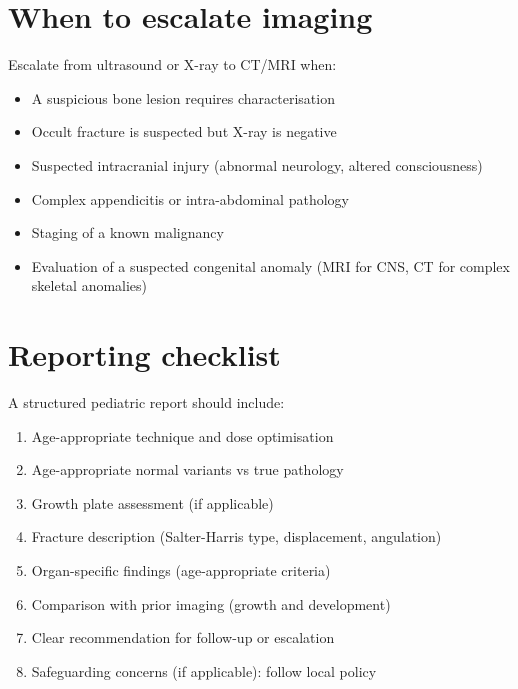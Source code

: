 \section{When to escalate imaging}
Escalate from ultrasound or X-ray to CT/MRI when:
\begin{itemize}
    \item A suspicious bone lesion requires characterisation
    \item Occult fracture is suspected but X-ray is negative
    \item Suspected intracranial injury (abnormal neurology, altered consciousness)
    \item Complex appendicitis or intra-abdominal pathology
    \item Staging of a known malignancy
    \item Evaluation of a suspected congenital anomaly (MRI for CNS, CT for complex skeletal anomalies)
\end{itemize}

\section{Reporting checklist}
A structured pediatric report should include:
\begin{enumerate}
    \item Age-appropriate technique and dose optimisation
    \item Age-appropriate normal variants vs true pathology
    \item Growth plate assessment (if applicable)
    \item Fracture description (Salter-Harris type, displacement, angulation)
    \item Organ-specific findings (age-appropriate criteria)
    \item Comparison with prior imaging (growth and development)
    \item Clear recommendation for follow-up or escalation
    \item Safeguarding concerns (if applicable): follow local policy
\end{enumerate}

\clearpage
